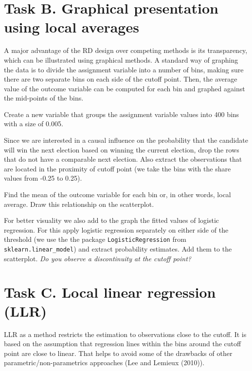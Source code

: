 \section*{Task B. Graphical presentation using local averages}

A major advantage of the RD design over competing methods is its transparency, which can be illustrated using graphical methods. A standard way of graphing the data is to divide the assignment variable  into a number of bins, making sure there are two separate bins on each side of the cutoff point. Then, the average value of the outcome variable can be computed for each bin and graphed against the mid-points of the bins.

\begin{boenumerate}

\item Create a new variable that groups the assignment variable values into 400 bins  with a size of 0.005.

\item Since we are interested in a causal influence on the probability that the candidate will win the next election based on winning the current election, drop the rows that do not have a comparable next election. Also extract the observations that are located in the proximity of cutoff point (we take the bins with the share values from -0.25 to 0.25).

\item Find the mean of the outcome variable for each bin or, in other words, local average. Draw this relationship on the scatterplot.

\item For better visuality we also add to the graph the fitted values of logistic regression. For this apply logistic regression separately on either side of the threshold (we use the the package \texttt{LogisticRegression} from \texttt{sklearn.linear\_model}) and extract probability estimates. Add them to the scatterplot. \emph{Do you observe a discontinuity at the cutoff point?}
\end{boenumerate}

\section*{Task C. Local linear regression (LLR)}

 LLR as a method restricts the estimation to observations close to the cutoff. It is based on the assumption that  regression lines within the bins around the cutoff point are close to linear. That helps to avoid some of the drawbacks of other parametric/non-parametrics approaches (Lee and Lemieux (2010)).

